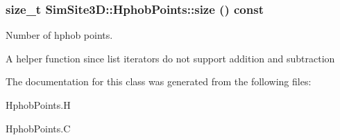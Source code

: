 \subsubsection{\setlength{\rightskip}{0pt plus 5cm}size\_\-t SimSite3D::Hphob\-Points::size () const\hspace{0.3cm}{\tt  [inline]}}\label{classSimSite3D_1_1HphobPoints_b1837926d048082c5aaf03d5cd3346cd}


Number of hphob points. 

A helper function since list iterators do not support addition and subtraction 

The documentation for this class was generated from the following files:\begin{CompactItemize}
\item 
Hphob\-Points.H\item 
Hphob\-Points.C\end{CompactItemize}
